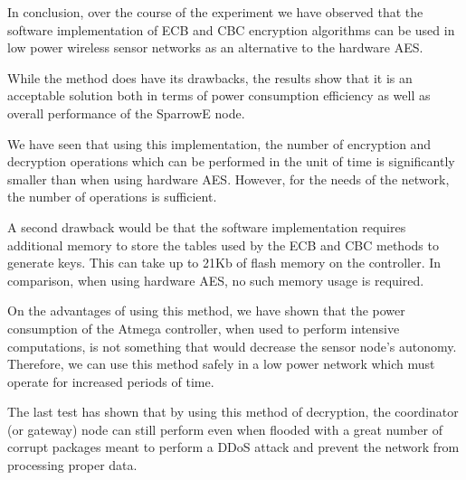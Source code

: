 In conclusion, over the course of the experiment we have observed that the 
software implementation of ECB and CBC encryption algorithms can be used in low 
power wireless sensor networks as an alternative to the hardware AES.

While the method does have its drawbacks, the results show that it is an 
acceptable solution both in terms of power consumption efficiency as well 
as overall performance of the SparrowE node.

We have seen that using this implementation, the number of encryption 
and decryption operations which can be performed in the unit of time 
is significantly smaller than when using hardware AES. However, for the 
needs of the network, the number of operations is sufficient.

A second drawback would be that the software implementation requires 
additional memory to store the tables used by the ECB and CBC methods 
to generate keys. This can take up to 21Kb of flash memory on the controller.
In comparison, when using hardware AES, no such memory usage is required.

On the advantages of using this method, we have shown that the power consumption 
of the Atmega controller, when used to perform intensive computations, is not 
something that would decrease the sensor node's autonomy. Therefore, we can 
use this method safely in a low power network which must operate for increased periods 
of time.

The last test has shown that by using this method of decryption, the coordinator (or 
gateway) node can still perform even when flooded with a great number of corrupt 
packages meant to perform a DDoS attack and prevent the network from processing 
proper data.
